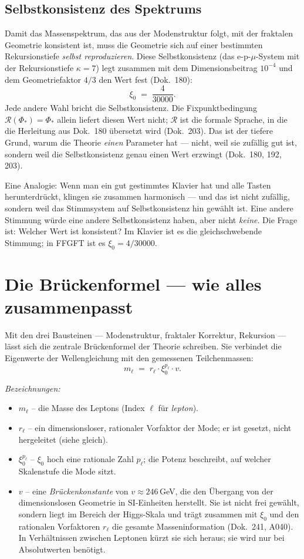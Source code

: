\subsection*{Selbstkonsistenz des Spektrums}
Damit das Massenspektrum, das aus der Modenstruktur folgt, mit der
fraktalen Geometrie konsistent ist, muss die Geometrie sich auf
einer bestimmten Rekursionstiefe \emph{selbst reproduzieren}. Diese
Selbstkonsistenz (das e-p-$\mu$-System mit der Rekursionstiefe
$\kappa = 7$) legt zusammen mit dem Dimensionsbeitrag $10^{-4}$ und
dem Geometriefaktor $4/3$ den Wert fest (Dok.~180):
\[
  \xi_0 \;=\; \frac{4}{30000}.
\]
Jede andere Wahl bricht die Selbstkonsistenz. Die Fixpunktbedingung
$\mathcal{R}(\Phi_*) = \Phi_*$ allein liefert diesen Wert nicht;
$\mathcal{R}$ ist die formale Sprache, in die die Herleitung aus
Dok.~180 übersetzt wird (Dok.~203). Das ist der
tiefere Grund, warum die Theorie \emph{einen} Parameter hat ---
nicht, weil sie zufällig gut ist, sondern weil die Selbstkonsistenz
genau einen Wert erzwingt (Dok.~180, 192, 203).

Eine Analogie: Wenn man ein gut gestimmtes Klavier hat und alle
Tasten herunterdrückt, klingen sie zusammen harmonisch --- und das
ist nicht zufällig, sondern weil das Stimmsystem auf
Selbstkonsistenz hin gewählt ist. Eine andere Stimmung würde eine
andere Selbstkonsistenz haben, aber nicht \emph{keine}. Die Frage
ist: Welcher Wert ist konsistent? Im Klavier ist es die
gleichschwebende Stimmung; in FFGFT ist es $\xi_0 = 4/30000$.

\section{Die Brückenformel --- wie alles zusammenpasst}

Mit den drei Bausteinen --- Modenstruktur, fraktaler Korrektur,
Rekursion --- lässt sich die zentrale Brückenformel der Theorie
schreiben. Sie verbindet die Eigenwerte der Wellengleichung mit den
gemessenen Teilchenmassen:
\[
  m_\ell \;=\; r_\ell \cdot \xi_0^{p_\ell} \cdot v.
\]

\noindent\textit{Bezeichnungen:}
\begin{itemize}\setlength\itemsep{0pt}
  \item $m_\ell$ -- die Masse des Leptons (Index $\ell$ für \emph{lepton}).
  \item $r_\ell$ -- ein dimensionsloser, rationaler Vorfaktor der
        Mode; er ist gesetzt, nicht hergeleitet (siehe gleich).
  \item $\xi_0^{p_\ell}$ -- $\xi_0$ hoch eine rationale Zahl $p_\ell$;
        die Potenz beschreibt, auf welcher Skalenstufe die Mode sitzt.
  \item $v$ -- eine \emph{Brückenkonstante} von $v \approx 246$\,GeV,
        die den Übergang von der dimensionslosen Geometrie in SI-Einheiten
        herstellt. Sie ist nicht frei gewählt, sondern liegt im Bereich
        der Higgs-Skala und trägt zusammen mit $\xi_0$ und den rationalen
        Vorfaktoren $r_\ell$ die gesamte Masseninformation (Dok.~241,
        A040). In Verhältnissen zwischen Leptonen kürzt sie sich heraus;
        sie wird nur bei Absolutwerten benötigt.
\end{itemize}

